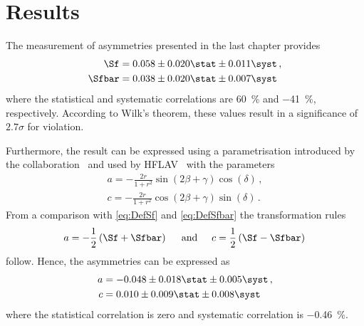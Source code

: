 \chapter{Results}

\linespread{1.08}\selectfont
The measurement of \CP asymmetries presented in the last chapter provides
\begin{equation}
\begin{aligned}
\Sf&=0.058\pm0.020\stat\pm0.011\syst\,,\\
\Sfbar&=0.038\pm0.020\stat\pm0.007\syst
\end{aligned}
\end{equation}
where the statistical and systematic correlations are \SI{60}{\percent} and \SI{-41}{\percent}, respectively.
According to Wilk's theorem, these values result in a significance of $2.7\sigma$ for \mbox{\CP violation}.

Furthermore, the result can be expressed using a parametrisation introduced by the \babar collaboration~\cite{Aubert:2006tw} and used by HFLAV~\cite{HFLAV2016} with the parameters
\begin{equation}
\begin{aligned}
a=-\frac{2r}{1+r^2}\sin\!\left(2\beta+\gamma\right)\cos\!\left(\delta\right)\,,\\
c=-\frac{2r}{1+r^2}\cos\!\left(2\beta+\gamma\right)\sin\!\left(\delta\right)\,.
\end{aligned}
\end{equation}
From a comparison with \cref{eq:DefSf} and \eqref{eq:DefSfbar} the transformation rules
\begin{equation}
a=-\frac{1}{2}\left(\Sf+\Sfbar\right)\hspace{0.5cm}\text{and}\hspace{0.5cm}c=\frac{1}{2}\left(\Sf-\Sfbar\right)\\
\end{equation}
follow.
Hence, the \CP asymmetries can be expressed as
\begin{equation}
\begin{aligned}
a&=-0.048\pm0.018\stat\pm0.005\syst\,,\\
c&=0.010\pm0.009\stat\pm0.008\syst\\
\end{aligned}
\end{equation}
where the statistical correlation is zero and systematic correlation is \SI{-0.46}{\percent}.

